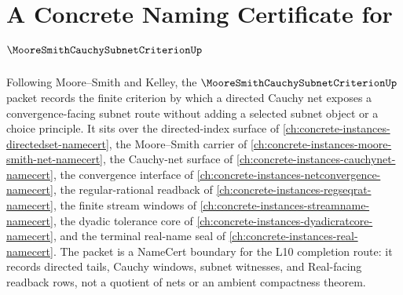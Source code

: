 \chapter{A Concrete Naming Certificate for $\MooreSmithCauchySubnetCriterionUp$}
\label{ch:concrete-instances-moore-smith-cauchy-subnet-criterion-namecert}

Following Moore--Smith and Kelley, the $\MooreSmithCauchySubnetCriterionUp$ packet records the finite criterion by which a directed Cauchy net exposes a convergence-facing subnet route without adding a selected subnet object or a choice principle. It sits over the directed-index surface of \autoref{ch:concrete-instances-directedset-namecert}, the Moore--Smith carrier of \autoref{ch:concrete-instances-moore-smith-net-namecert}, the Cauchy-net surface of \autoref{ch:concrete-instances-cauchynet-namecert}, the convergence interface of \autoref{ch:concrete-instances-netconvergence-namecert}, the regular-rational readback of \autoref{ch:concrete-instances-regseqrat-namecert}, the finite stream windows of \autoref{ch:concrete-instances-streamname-namecert}, the dyadic tolerance core of \autoref{ch:concrete-instances-dyadicratcore-namecert}, and the terminal real-name seal of \autoref{ch:concrete-instances-real-namecert}. The packet is a NameCert boundary for the L10 completion route: it records directed tails, Cauchy windows, subnet witnesses, and Real-facing readback rows, not a quotient of nets or an ambient compactness theorem.

